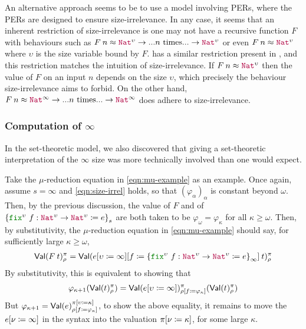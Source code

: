 An alternative approach seems to be to use a model involving PERs,
where the PERs are designed to ensure size-irrelevance.
%
In any case, it seems that an inherent restriction of size-irrelevance
is one may not have a recursive function $F$ with behaviours such as
$\app{F}{n} \approx \Nat^\upsilon \to ...n\text{ times}... \to
\Nat^\upsilon$ or even $\app{F}{n} \approx \Nat^\upsilon$ where
$\upsilon$ is the size variable bound by $F$.
%
\citet{cic-hat-minus} has a similar restriction present in
\CIChatminus, and this restriction matches the intuition of
size-irrelevance.
%
If $\app{F}{n} \approx \Nat^\upsilon$ then the value of $F$ on an
input $n$ depends on the size $\upsilon$, which precisely the
behaviour size-irrelevance aims to forbid.
%
On the other hand, $\app{F}{n} \approx \Nat^\infty \to
...n\text{ times}...\to\Nat^\infty$ does adhere to size-irrelevance.

\subsubsection{Computation of $\infty$}
%
In the set-theoretic model, we also discovered that giving a
set-theoretic interpretation of the $\infty$ size was more technically
involved than one would expect.

Take the $\mu$-reduction equation in \eqref{eqn:mu-example} as an
example.
%
Once again, assume $s=\infty$ and \eqref{eqn:size-irrel} holds, so that
$(\varphi_\alpha)_\alpha$ is constant beyond $\omega$.
%
Then, by the previous discussion, the value of $F$ and of
$\left\{\kw{fix}^\upsilon ~ f : \Nat^\upsilon \to \Nat^\upsilon
  \coloneqq e\right\}_{s}$ are both taken to be
$\varphi_\omega = \varphi_{\kappa}$ for all $\kappa \geq \omega$.
%
Then, by substitutivity, the $\mu$-reduction equation in
\eqref{eqn:mu-example} should say, for sufficiently large
$\kappa \geq \omega$,
%
\begin{align*}
  \Val(\app{F}{t})_\rho^\pi =
  \Val(\app{\subst{\subst{e}{\upsilon}{\infty}}{f}{
  \left\{\kw{fix}^\upsilon ~ f : \Nat^\upsilon \to \Nat^\upsilon \coloneqq e\right\}_{\infty}
  }}{t})_\rho^\pi
\end{align*}
%
By substitutivity, this is equivalent to showing that
%
\begin{align*}
  \varphi_{\kappa+1}(\textsf{Val}(t)_\rho^\pi) =
  \textsf{Val}(e [\upsilon \coloneqq \infty])_{\rho [f \coloneqq \varphi_\kappa]}^{\pi}(\textsf{Val}(t)_\rho^\pi)
\end{align*}
%
But
$\varphi_{\kappa+1} =
\textsf{Val}(e)_{\rho [f \coloneqq \varphi_\kappa]}^{\pi [\upsilon \coloneqq \kappa]}$,
to show the above equality, it remains to move the
$e [\nu \coloneqq \infty]$ in the syntax into the valuation
$\pi [\nu \coloneqq \kappa]$, for some large $\kappa$.

